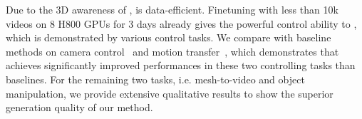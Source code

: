 
Due to the 3D awareness of \methodname, \methodname is data-efficient. Finetuning with less than 10k videos on 8 H800 GPUs for 3 days already gives the powerful control ability to \methodname, which is demonstrated by various control tasks. 
We compare \methodname with baseline methods on camera control~\cite{wang2024motionctrl,he2024cameractrl} and motion transfer~\cite{geyer2023tokenflow}, which demonstrates that \methodname achieves significantly improved performances in these two controlling tasks than baselines. 
For the remaining two tasks, i.e. mesh-to-video and object manipulation, we provide extensive qualitative results to show the superior generation quality of our method.

